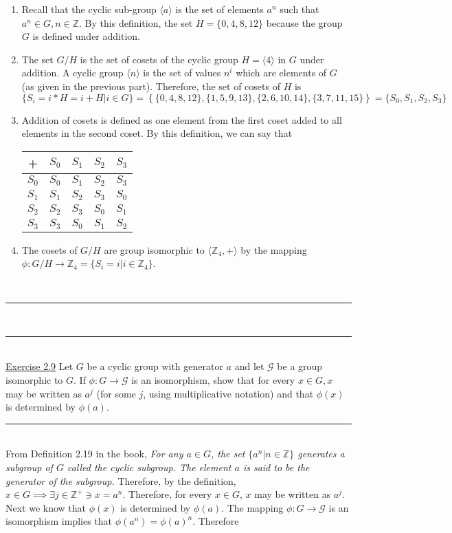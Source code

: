 \documentclass{article}
\newcommand{\problemsep}{\leavevmode\\[0.05in] \rule[\baselineskip/4]{\textwidth}{1pt} \\[0.005in] \rule[\baselineskip]{\textwidth}{1pt}\vspace{-\baselineskip}\leavevmode\\[0.05in]}
\newcommand{\statementsep}{\leavevmode\\[0.005in] \rule[\baselineskip/4]{\textwidth}{0.4pt}\leavevmode\\[0.005in]}
\begin{document}
\begin{enumerate}
	\item Recall that the cyclic sub-group $\langle a \rangle$ is the set of elements $a^n$ such that $a^n \in G, n \in \mathbb{Z}$. By this definition, the set $H = \{ 0, 4, 8, 12 \}$ because the group $G$ is defined under addition.  \item The set $G/H$ is the set of cosets of the cyclic group $H = \langle 4 \rangle$ in $G$ under addition. A cyclic group $\langle n \rangle$ is the set of values $n^i$ which are elements of $G$ (as given in the previous part).  Therefore, the set of cosets of $H$ is $\{ S_i = i*H = i + H | i \in G\} = \left\{ \{0, 4, 8, 12 \}, \{1, 5, 9, 13 \}, \{2, 6, 10, 14 \}, \{3, 7, 11, 15 \} \right \} = \{S_0, S_1, S_2, S_3\}$
	\item Addition of cosets is defined as one element from the first coset added to all elements in the second coset. By this definition, we can say that
	\begin{center}\begin{tabular}{c | c c c c}
		+    & $S_0$ & $S_1$ & $S_2$ & $S_3$ \\ \hline
   $S_0$ & $S_0$ & $S_1$ & $S_2$ & $S_3$ \\
	 $S_1$ & $S_1$ & $S_2$ & $S_3$ & $S_0$ \\
	 $S_2$ & $S_2$ & $S_3$ & $S_0$ & $S_1$ \\
	 $S_3$ & $S_3$ & $S_0$ & $S_1$ & $S_2$ \\
	\end{tabular} \end{center}
	\item The cosets of $G/H$ are group isomorphic to $\langle \mathbb{Z}_4, + \rangle$ by the mapping $\phi: G/H \rightarrow \mathbb{Z}_4 = \{S_i = i | i \in \mathbb{Z}_4 \}$.
\end{enumerate}
\problemsep
\noindent\underline{Exercise 2.9}
Let $G$ be a cyclic group with  generator $a$ and let $\mathcal{G}$ be a group isomorphic to $G$. If $\phi : G \rightarrow \mathcal{G}$ is an isomorphism, show that for every $x \in G, x$ may be written as $a^j$ (for some $j$, using multiplicative notation) and that $\phi(x)$ is determined by $\phi(a)$.
\statementsep
From Definition 2.19 in the book, {\it For any $a \in G$, the set $\{ a^n|n \in \mathbb{Z} \}$ generates a subgroup of $G$ called the cyclic subgroup. The element $a$ is said to be the generator of the subgroup.} Therefore, by the definition, $x \in G \implies \exists j \in \mathbb{Z}^+ \ni x = a^n$. Therefore, for every $x \in G$, $x$ may be written as $a^j$.  Next we know that $\phi(x)$ is determined by $\phi(a)$. The mapping $\phi: G \rightarrow \mathcal{G}$ is an isomorphism implies that $\phi(a^n) = \phi(a)^n$. Therefore
\end{document}
